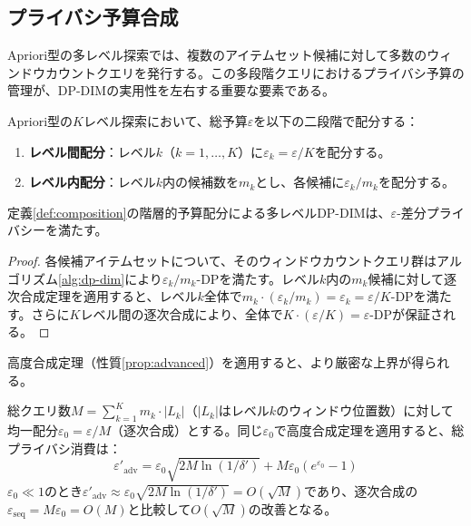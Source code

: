 \subsection{プライバシ予算合成}\label{subsec:composition}

Apriori型の多レベル探索では、複数のアイテムセット候補に対して多数のウィンドウカウントクエリを発行する。この多段階クエリにおけるプライバシ予算の管理が、DP-DIMの実用性を左右する重要な要素である。

\begin{definition}[階層的予算配分]\label{def:composition}
Apriori型の$K$レベル探索において、総予算$\varepsilon$を以下の二段階で配分する：
\begin{enumerate}
  \item \textbf{レベル間配分}：レベル$k$（$k = 1, \ldots, K$）に$\varepsilon_k = \varepsilon / K$を配分する。
  \item \textbf{レベル内配分}：レベル$k$内の候補数を$m_k$とし、各候補に$\varepsilon_k / m_k$を配分する。
\end{enumerate}
\end{definition}

\begin{theorem}[多レベル探索のプライバシー保証]\label{thm:multi-level}
定義\ref{def:composition}の階層的予算配分による多レベルDP-DIMは、$\varepsilon$-差分プライバシーを満たす。
\end{theorem}

\begin{proof}
各候補アイテムセットについて、そのウィンドウカウントクエリ群はアルゴリズム\ref{alg:dp-dim}により$\varepsilon_k / m_k$-DPを満たす。レベル$k$内の$m_k$候補に対して逐次合成定理を適用すると、レベル$k$全体で$m_k \cdot (\varepsilon_k / m_k) = \varepsilon_k = \varepsilon / K$-DPを満たす。さらに$K$レベル間の逐次合成により、全体で$K \cdot (\varepsilon / K) = \varepsilon$-DPが保証される。
\end{proof}

高度合成定理（性質\ref{prop:advanced}）を適用すると、より厳密な上界が得られる。

\begin{corollary}[高度合成による予算効率]\label{cor:multi-level}
総クエリ数$M = \sum_{k=1}^{K} m_k \cdot |L_k|$（$|L_k|$はレベル$k$のウィンドウ位置数）に対して均一配分$\varepsilon_0 = \varepsilon / M$（逐次合成）とする。同じ$\varepsilon_0$で高度合成定理を適用すると、総プライバシ消費は：
\[
\varepsilon'_\text{adv} = \varepsilon_0 \sqrt{2M\ln(1/\delta')} + M\varepsilon_0(e^{\varepsilon_0} - 1)
\]
$\varepsilon_0 \ll 1$のとき$\varepsilon'_\text{adv} \approx \varepsilon_0\sqrt{2M\ln(1/\delta')} = O(\sqrt{M})$であり、逐次合成の$\varepsilon_\text{seq} = M\varepsilon_0 = O(M)$と比較して$O(\sqrt{M})$の改善となる。
\end{corollary}
